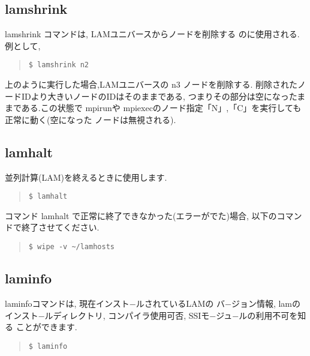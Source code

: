 \documentclass[a4paper,titlepage]{jreport}
\begin{document}
\subsection{lamshrink}
lamshrink コマンドは, LAMユニバースからノードを削除する
のに使用される.例として,

\begin{quote}
\begin{screen}
\begin{verbatim}
$ lamshrink n2
\end{verbatim}
\end{screen}
\end{quote}

上のように実行した場合,LAMユニバースの n3 ノードを削除する.
削除されたノードIDより大きいノードのIDはそのままである,
つまりその部分は空になったままである.この状態で mpirunや
mpiexecのノード指定「N」,「C」を実行しても正常に動く(空になった
ノードは無視される).

\subsection{lamhalt}
並列計算(LAM)を終えるときに使用します.

\begin{quote}
\begin{screen}
\begin{verbatim}
$ lamhalt
\end{verbatim}
\end{screen}
\end{quote}

コマンド lamhalt で正常に終了できなかった(エラーがでた)場合,
以下のコマンドで終了させてください.

\begin{quote}
\begin{screen}
\begin{verbatim}
$ wipe -v ~/lamhosts
\end{verbatim}
\end{screen}
\end{quote}

\subsection{laminfo}
laminfoコマンドは, 現在インスト−ルされているLAMの
バ−ジョン情報, lamのインスト−ルディレクトリ,
コンパイラ使用可否, SSIモ−ジュ−ルの利用不可を知る
ことができます.

\begin{quote}
\begin{screen}
\begin{verbatim}
$ laminfo
\end{verbatim}
\end{screen}
\end{quote}
\end{document}
